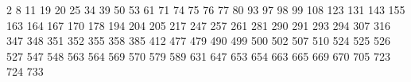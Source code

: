 2
8
11
19
20
25
34
39
50
53
61
71
74
75
76
77
80
93
97
98
99
108
123
131
143
155
163
164
167
170
178
194
204
205
217
247
257
261
281
290
291
293
294
307
316
347
348
351
352
355
358
385
412
477
479
490
499
500
502
507
510
524
525
526
527
547
548
563
564
569
570
579
589
631
647
653
654
663
665
669
670
705
723
724
733


